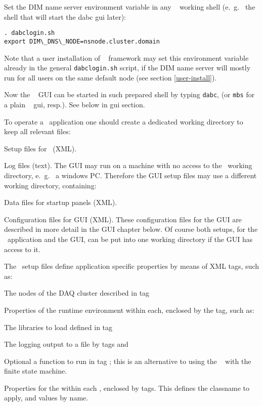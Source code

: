 \item Set the DIM name server environment variable in any \dabc~ working shell (e.~g.~
the shell that will start the dabc gui later):
\begin{verbatim}
. dabclogin.sh
export DIM\_DNS\_NODE=nsnode.cluster.domain
\end{verbatim} 
Note that a user installation of \dabc~ framework may set this 
environment variable already in the general {\tt dabclogin.sh} script, if the DIM name server will 
mostly run for all users on the same default node (see section \ref{user-install}).  

\item Now the \dabc~ GUI can be started in such prepared shell by typing {\tt dabc}, (or 
{\tt mbs} for a plain \mbs~ gui, resp.). See below in gui section.  

\enum



To operate a \dabc\ application one should create a dedicated 
working directory to keep all relevant files:
\bbul
\item Setup files for \dabc\ (XML).
\item Log files (text).
\ebul
The GUI may run on a machine with no access to the \dabc\ working directory,
e.~g.~ a windows PC.
Therefore the GUI setup files may use a different
working directory, containing: 
\bbul
\item Data files for startup panels (XML).
\item Configuration files for GUI (XML).
\ebul
These configuration files for the GUI are described in more detail 
in the GUI chapter below.
Of course both setups, for the \dabc\ application and the GUI, can be
put into one working directory if the GUI has access to it.

The \dabc\  setup files define application specific properties
by means of XML tags, such as:

\bbul
\item The nodes of the DAQ cluster described in tag 
\item Properties of the runtime environment within each, enclosed
by the   tag, such as:
\bbul
	\item The libraries to load defined in   tag  
	\item The logging output to a file by tags  and 
	\item Optional a function to run in tag ; this is an
	alternative to using the \dabc\  with the finite state machine.
\ebul
\item Properties for the  within each , 
enclosed by  tags. This defines the  classname
to apply, and  values by name.

